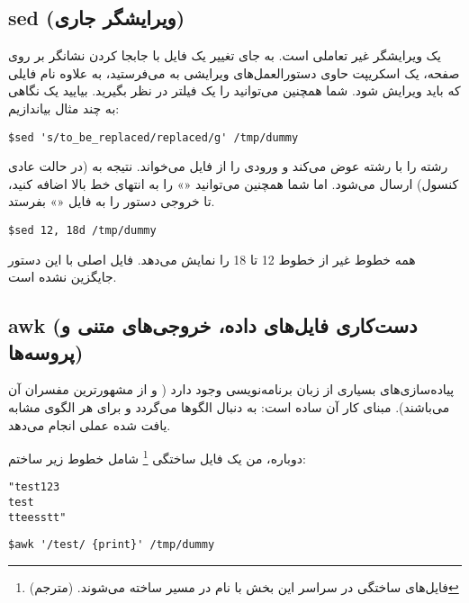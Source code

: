 \subsection*{{\codefont sed} (ویرایشگر جاری)}
 یک ویرایشگر غیر تعاملی است. به جای تغییر یک فایل با جابجا کردن نشانگر بر روی
صفحه، یک اسکریپت حاوی دستورالعمل‌های ویرایشی به  می‌فرستید، به علاوه نام فایلی
که باید ویرایش شود. شما همچنین می‌توانید  را یک فیلتر در نظر بگیرید. بیایید یک
نگاهی به چند مثال‌ بیاندازیم‌:
\begin{latin}
\begin{lstlisting}
$sed 's/to_be_replaced/replaced/g' /tmp/dummy
\end{lstlisting}
\end{latin}
 رشته  را با رشته  عوض می‌کند و ورودی را از فایل 
می‌خواند‌. نتیجه به  (در حالت عادی کنسول) ارسال می‌شود‌. اما شما همچنین می‌توانید
«»
را به انتهای خط بالا اضافه کنید‌، تا  خروجی دستور را به فایل «»
بفرستد‌.
\begin{latin}
\begin{lstlisting}
$sed 12, 18d /tmp/dummy
\end{lstlisting}
\end{latin}
 همه خطوط غیر از خطوط 12 تا 18 را نمایش می‌دهد‌. فایل اصلی با این دستور جایگزین
نشده است‌.


\subsection*{{\codefont awk} (دست‌کاری فایل‌های داده‌، خروجی‌های متنی و پروسه‌ها)}
پیاده‌سازی‌های بسیاری از زبان برنامه‌نویسی  وجود دارد (
و  از مشهورترین مفسران آن می‌باشند). مبنای کار آن ساده است:  به دنبال الگوها می‌گردد و برای
هر الگوی مشابه یافت شده عملی انجام می‌دهد.

دوباره، من یک فایل ساختگی
\footnote{
فایل‌های ساختگی در سراسر این بخش با نام  در مسیر  ساخته می‌شوند.
(مترجم)
}
شامل خطوط زیر ساختم:
\begin{latin}
\begin{lstlisting}
"test123
test
tteesstt"
\end{lstlisting}
\end{latin}

\begin{latin}
\begin{lstlisting}
$awk '/test/ {print}' /tmp/dummy
\end{lstlisting}
\end{latin}

